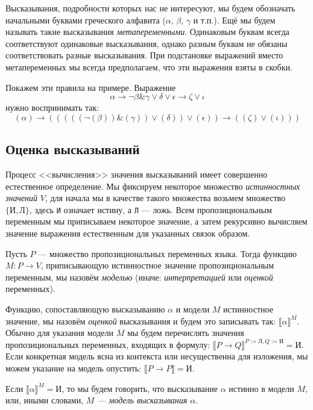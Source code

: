 Высказывания, подробности
которых нас не интересуют, мы будем обозначать начальными буквами 
греческого алфавита
($\alpha$, $\beta$, $\gamma$ и т.п.). 
Ещё мы будем называть такие
высказывания \emph{метапеременными}.
Одинаковым буквам всегда соответствуют
одинаковые высказывания, однако разным буквам не обязаны соответствовать
разные высказывания. 
При подстановке выражений вместо метапеременных мы всегда предполагаем,
что эти выражения взяты в скобки.

Покажем эти правила на примере. Выражение
$$\alpha \rightarrow \neg \beta \& \gamma \vee \delta \vee \epsilon \rightarrow \zeta\vee\iota$$
нужно воспринимать так:
$$(\alpha) \rightarrow \left(((((\neg (\beta)) \& (\gamma)) \vee (\delta)) \vee (\epsilon)) \rightarrow ((\zeta)\vee(\iota))\right)$$

\subsection{Оценка высказываний}

Процесс <<вычисления>> значения высказываний имеет совершенно
естественное определение. Мы фиксируем некоторое множество
\emph{истинностных значений} $V$, для начала мы в качестве такого множества возьмем 
множество $\{\texttt{И}, \texttt{Л}\}$, здесь \texttt{И} означает истину, а
\texttt{Л} --- ложь. Всем пропозициональным переменным мы приписываем некоторое
значение, а затем рекурсивно вычисляем значение выражения естественным для указанных
связок образом.

Пусть $P$ --- множество пропозициональных переменных языка.
Тогда функцию $M: P \rightarrow V$, приписывающую истинностное 
значение пропозициональным переменным, мы назовём \emph{моделью} 
(иначе: \emph{интерпретацией} или \emph{оценкой} переменных). 

Функцию, сопоставляющую высказыванию $\alpha$ и модели $M$
истинностное значение, мы назовём \emph{оценкой} высказывания и
будем это записывать так: $\llbracket \alpha \rrbracket ^ M$.
Обычно для указания модели $M$ мы будем перечислять значения
пропозициональных переменных, входящих в формулу:
$\llbracket P \rightarrow Q \rrbracket ^ {P:=\texttt{Л}, Q:=\texttt{И}} = \texttt{И}$.
Если конкретная модель ясна из контекста или несущественна для изложения,
мы можем указание на модель опустить: $\llbracket P \rightarrow P \rrbracket = \texttt{И}$.

Если $\llbracket \alpha \rrbracket ^ M = \texttt{И}$, то мы будем 
говорить, что высказывание $\alpha$ истинно в модели $M$, или, иными словами,
\emph{$M$ --- модель высказывания $\alpha$}.

